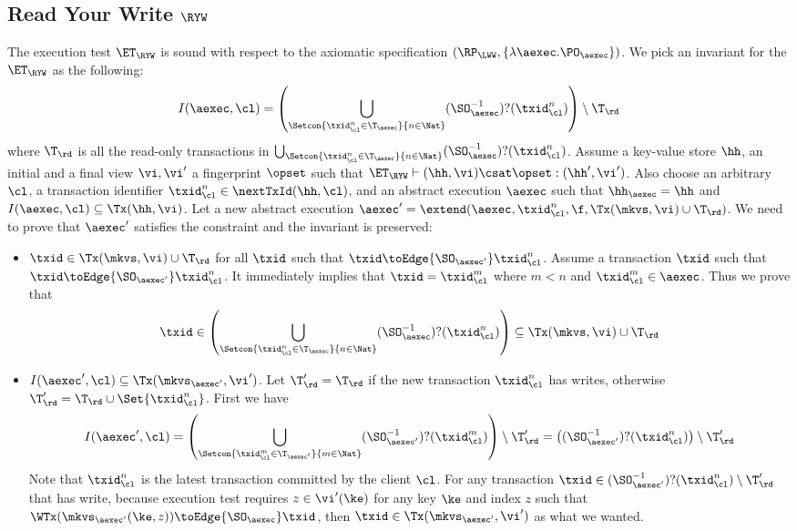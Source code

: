 \subsection{Read Your Write \( \RYW \) }

\label{sec:sound-complete-ryw}

The execution test $\ET_\RYW$ is sound with respect to the axiomatic specification 
$(\RP_{\LWW}, \{\lambda \aexec. \PO_{\aexec} \})$.
We pick an invariant for the \( \ET_\RYW \) as the following:
\[
    I(\aexec, \cl) = \left( \bigcup_{\Setcon{\txid_{\cl}^{n} \in \T_{\aexec} }{ n \in \Nat }} (\SO_{\aexec}^{-1})?(\txid^n_\cl) \right) \setminus \T_\rd
\]
where \( \T_\rd \) is all the read-only transactions in \( \bigcup_{\Setcon{\txid_{\cl}^{n} \in \T_{\aexec} }{ n \in \Nat }} (\SO_{\aexec}^{-1})?(\txid^n_\cl) \).
Assume a key-value store $\hh$, an initial and a final view $\vi, \vi'$  a fingerprint $\opset$ 
such that $\ET_{\RYW} \vdash (\hh, \vi) \csat \opset: (\hh',\vi')$. 
Also choose an arbitrary $\cl$, a transaction identifier $\txid_\cl^n \in \nextTxId(\hh, \cl)$, 
and an abstract execution $\aexec$ such that $\hh_{\aexec} = \hh$ and 
\( I(\aexec, \cl) \subseteq \Tx(\hh, \vi) \).
Let a new abstract execution \( \aexec' = \extend(\aexec, \txid_\cl^n, \f, \Tx(\mkvs, \vi) \cup \T_\rd) \).
We need to prove that \( \aexec' \) satisfies the constraint and the invariant is preserved:
\begin{itemize}
    \item \( \txid \in \Tx(\mkvs, \vi) \cup \T_\rd  \) for all \( \txid \) such that \( \txid \toEdge{\SO_{\aexec'}} \txid_\cl^n  \). 
    Assume a transaction \( \txid \) such that \( \txid \toEdge{\SO_{\aexec'}} \txid_\cl^n \).
It immediately implies that \( \txid = \txid_\cl^m\) where \( m < n \) and \( \txid_\cl^m \in \aexec \).
Thus we prove that 
\[ 
    \txid \in \left( \bigcup_{\Setcon{\txid_{\cl}^{n} \in \T_{\aexec} }{ n \in \Nat}} (\SO_{\aexec}^{-1})?(\txid^n_\cl) \right) \subseteq \Tx(\mkvs,\vi) \cup \T_\rd
\]
\item \(I(\aexec',\cl) \subseteq \Tx(\mkvs_{\aexec'}, \vi') \).
Let \( \T'_\rd = \T_\rd \) if the new transaction \( \txid_\cl^n\) has writes, otherwise \( \T'_\rd = \T_\rd \cup \Set{\txid_\cl^n}\).
First we have
\[ I(\aexec', \cl) = \left(\bigcup_{\Setcon{\txid_{\cl}^{m} \in \T_{\aexec'} }{ m \in \Nat }} (\SO_{\aexec'}^{-1})?(\txid^m_\cl) \right) \setminus \T'_{\rd} = \left( (\SO_{\aexec'}^{-1})?(\txid^n_\cl) \right) \setminus \T'_\rd 
\]
Note that \( \txid^n_\cl \) is the latest transaction committed by the client \( \cl \).
For any transaction \( \txid \in (\SO_{\aexec'}^{-1})?(\txid^n_\cl) \setminus \T'_\rd \) that has write,
because execution test requires \( z \in \vi'(\ke) \) for any key \( \ke \) and index \( z \) such that \( \WTx( \mkvs_{\aexec'}(\ke, z) ) \toEdge{\SO_\aexec} \txid \),
then \( \txid \in \Tx(\mkvs_{\aexec'}, \vi') \) as what we wanted.
\end{itemize}

